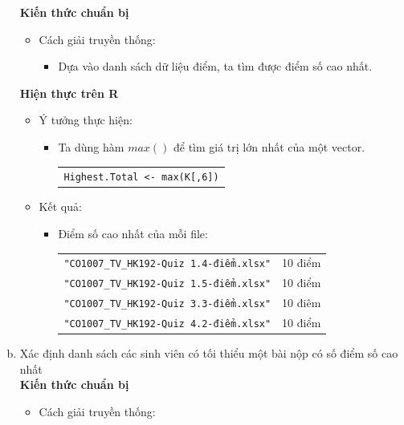 \documentclass[a4paper]{article}
\theoremstyle{definition}
\begin{document}
\begin{enumerate}[a)]
    \bf Kiến thức chuẩn bị\normalfont
    \begin{itemize}
        \item Cách giải truyền thống:
        \begin{itemize}
            \item Dựa vào danh sách dữ liệu điểm, ta tìm được điểm số cao nhất.
        \end{itemize}
    \end{itemize}
    \bf Hiện thực trên R\normalfont
    \begin{itemize}
        \item Ý tưởng thực hiện:
        \begin{itemize}
            \item Ta dùng hàm $max()$ để tìm giá trị lớn nhất của một vector.
            \begin{center}
                \begin{tabular}{p{13cm}}
                    \texttt{Highest.Total <- max(K[,6])}
                \end{tabular}
            \end{center}
        \end{itemize}
        \item Kết quả:
        \begin{itemize}
            \item Điểm số cao nhất của mỗi file:
            \begin{center}
                \begin{tabular}{l c}
                     \texttt{"CO1007\_TV\_HK192-Quiz 1.4-điểm.xlsx"} & 10 điểm\\
                     \texttt{"CO1007\_TV\_HK192-Quiz 1.5-điểm.xlsx"} & 10 điểm\\
                     \texttt{"CO1007\_TV\_HK192-Quiz 3.3-điểm.xlsx"} & 10 điêm\\
                     \texttt{"CO1007\_TV\_HK192-Quiz 4.2-điểm.xlsx"} & 10 điểm
                \end{tabular}
            \end{center}
        \end{itemize}
    \end{itemize}
    \bf\item {Xác định danh sách các sinh viên có tối thiểu một bài nộp có số điểm số cao nhất}\\[6pt]
    \bf Kiến thức chuẩn bị\normalfont
    \begin{itemize}
        \item Cách giải truyền thống:

\end{itemize}
\end{enumerate}
\end{document}
